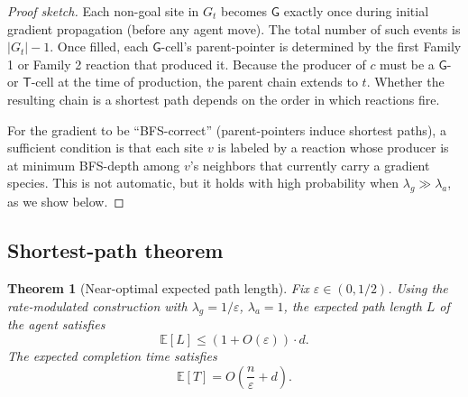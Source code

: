 \documentclass[11pt]{article}
\theoremstyle{plain}
\newtheorem{theorem}{Theorem}
\theoremstyle{definition}
\theoremstyle{remark}
\begin{document}
\begin{proof}[Proof sketch]
Each non-goal site in $G_t$ becomes $\mathsf{G}$ exactly once during initial gradient propagation (before any agent move). The total number of such events is $|G_t| - 1$. Once filled, each $\mathsf{G}$-cell's parent-pointer is determined by the first Family 1 or Family 2 reaction that produced it. Because the producer of $c$ must be a $\mathsf{G}$- or $\mathsf{T}$-cell at the time of production, the parent chain extends to $t$. Whether the resulting chain is a shortest path depends on the order in which reactions fire.

For the gradient to be ``BFS-correct'' (parent-pointers induce shortest paths), a sufficient condition is that each site $v$ is labeled by a reaction whose producer is at minimum BFS-depth among $v$'s neighbors that currently carry a gradient species. This is not automatic, but it holds with high probability when $\lambda_g \gg \lambda_a$, as we show below.
\end{proof}

\subsection{Shortest-path theorem}

\begin{theorem}[Near-optimal expected path length]
\label{thm:shortest-path}
Fix $\varepsilon \in (0, 1/2)$. Using the rate-modulated construction with $\lambda_g = 1/\varepsilon$, $\lambda_a = 1$, the expected path length $L$ of the agent satisfies
\[
\mathbb{E}[L] \leq (1 + O(\varepsilon)) \cdot d.
\]
The expected completion time satisfies
\[
\mathbb{E}[T] = O\left(\frac{n}{\varepsilon} + d\right).
\]
\end{theorem}
\end{document}
